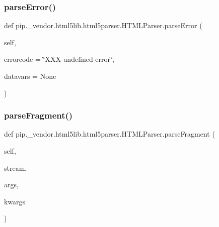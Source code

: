 \subsubsection{\texorpdfstring{parse\+Error()}{parseError()}}
{\footnotesize\ttfamily def pip.\+\_\+vendor.\+html5lib.\+html5parser.\+H\+T\+M\+L\+Parser.\+parse\+Error (\begin{DoxyParamCaption}\item[{}]{self,  }\item[{}]{errorcode = {\ttfamily \char`\"{}XXX-\/undefined-\/error\char`\"{}},  }\item[{}]{datavars = {\ttfamily None} }\end{DoxyParamCaption})}

\mbox{\label{classpip_1_1__vendor_1_1html5lib_1_1html5parser_1_1HTMLParser_ade6e4581925c9d58fd499df172fc88ce}} 
\subsubsection{\texorpdfstring{parse\+Fragment()}{parseFragment()}}
{\footnotesize\ttfamily def pip.\+\_\+vendor.\+html5lib.\+html5parser.\+H\+T\+M\+L\+Parser.\+parse\+Fragment (\begin{DoxyParamCaption}\item[{}]{self,  }\item[{}]{stream,  }\item[{}]{args,  }\item[{}]{kwargs }\end{DoxyParamCaption})}

